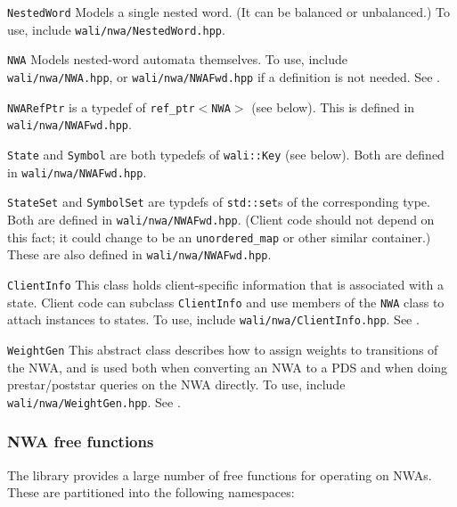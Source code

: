 \begin{description}
  \item\texttt{NestedWord} Models a single nested word. (It can be
    balanced or unbalanced.) To use, include \texttt{wali/nwa/NestedWord.hpp}.
  \item\texttt{NWA} Models nested-word automata themselves. To use, include
    \texttt{wali/nwa/NWA.hpp}, or \texttt{wali/nwa/NWAFwd.hpp} if a
    definition is not needed. See .
  \item\texttt{NWARefPtr} is a typedef of \texttt{ref\_ptr$<$NWA$>$} (see
    below). This is defined in \texttt{wali/nwa/NWAFwd.hpp}.
  \item\texttt{State} and \texttt{Symbol} are both typedefs of
    \texttt{wali::Key} (see below). Both are defined in
    \texttt{wali/nwa/NWAFwd.hpp}.
  \item\texttt{StateSet} and \texttt{SymbolSet} are typdefs of
    \texttt{std::set}s of the corresponding type. Both are defined in
    \texttt{wali/nwa/NWAFwd.hpp}. (Client code should not depend on this
    fact; it could change to be an \texttt{unordered\_map} or other similar
    container.) These are also defined in \texttt{wali/nwa/NWAFwd.hpp}.
  \item\texttt{ClientInfo} This class holds client-specific information that
    is associated with a state. Client code can subclass \texttt{ClientInfo} and use
    members of the \texttt{NWA} class to attach instances to states. To use,
    include \texttt{wali/nwa/ClientInfo.hpp}. See .
  \item\texttt{WeightGen} This abstract class describes how to assign weights
    to transitions of the NWA, and is used both when converting an NWA to a
    PDS and when doing prestar/poststar queries on the NWA directly. To use,
    include \texttt{wali/nwa/WeightGen.hpp}. See .
\end{description}


\subsubsection{NWA free functions}

The library provides a large number of free functions for operating on
NWAs. These are partitioned into the following namespaces:

